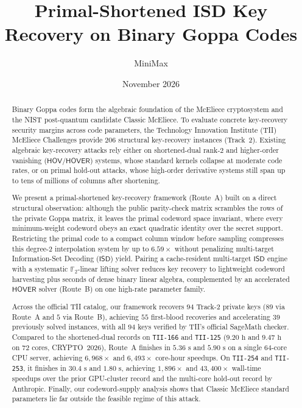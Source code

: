 \documentclass[11pt,a4paper]{article}
\title{\textbf{Primal-Shortened ISD Key Recovery on Binary Goppa Codes}}
\author{MiniMax}
\date{November 2026}
\theoremstyle{definition}
\theoremstyle{remark}
\newcommand{\F}{\mathbb{F}}
\newcommand{\ISD}{\mathsf{ISD}}
\newcommand{\HOV}{\mathsf{HOV}}
\newcommand{\HOVER}{\mathsf{HOVER}}
\begin{document}
\maketitle

\begin{abstract}
Binary Goppa codes form the algebraic foundation of the McEliece cryptosystem and the NIST post-quantum candidate Classic McEliece. To evaluate concrete key-recovery security margins across code parameters, the Technology Innovation Institute (TII) McEliece Challenges provide $206$ structural key-recovery instances (Track~2). Existing algebraic key-recovery attacks rely either on shortened-dual rank-$2$ and higher-order vanishing ($\HOV/\HOVER$) systems, whose standard kernels collapse at moderate code rates, or on primal hold-out attacks, whose high-order derivative systems still span up to tens of millions of columns after shortening.

We present a primal-shortened key-recovery framework (Route~A) built on a direct structural observation: although the public parity-check matrix scrambles the rows of the private Goppa matrix, it leaves the primal codeword space invariant, where every minimum-weight codeword obeys an exact quadratic identity over the secret support. Restricting the primal code to a compact column window before sampling compresses this degree-$2$ interpolation system by up to $6.59\times$ without penalizing multi-target Information-Set Decoding ($\ISD$) yield. Pairing a cache-resident multi-target $\ISD$ engine with a systematic $\F_2$-linear lifting solver reduces key recovery to lightweight codeword harvesting plus seconds of dense binary linear algebra, complemented by an accelerated $\HOVER$ solver (Route~B) on one high-rate parameter family.

Across the official TII catalog, our framework recovers $94$ Track-2 private keys ($89$ via Route~A and $5$ via Route~B), achieving $55$ first-blood recoveries and accelerating $39$ previously solved instances, with all $94$ keys verified by TII's official SageMath checker. Compared to the shortened-dual records on \texttt{TII-166} and \texttt{TII-125} ($9.20\text{ h}$ and $9.47\text{ h}$ on $72$ cores, CRYPTO~2026), Route~A finishes in $5.36\text{ s}$ and $5.90\text{ s}$ on a single $64$-core CPU server, achieving $6{,}968\times$ and $6{,}493\times$ core-hour speedups. On \texttt{TII-254} and \texttt{TII-253}, it finishes in $30.4\text{ s}$ and $1.80\text{ s}$, achieving $1{,}896\times$ and $43{,}400\times$ wall-time speedups over the prior GPU-cluster record and the multi-core hold-out record by Anthropic. Finally, our codeword-supply analysis shows that Classic McEliece standard parameters lie far outside the feasible regime of this attack.
\end{abstract}
\end{document}

